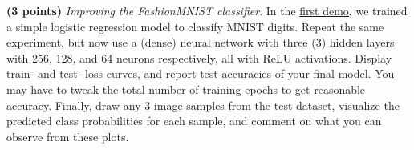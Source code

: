\noindent {} 
\textbf{(3 points)} \textit{Improving the FashionMNIST classifier}. In the \href{https://github.com/kvgarimella/dl-demos/blob/main/demo01-basics.ipynb}{\underline{first demo}}, we trained a simple logistic regression model to classify MNIST digits. Repeat the same experiment, but now use a (dense) neural network with three (3) hidden layers with 256, 128, and 64 neurons respectively, all with ReLU activations. Display train- and test- loss curves, and report test accuracies of your final model. You may have to tweak the total number of training epochs to get reasonable accuracy. Finally, draw any 3 image samples from the test dataset, visualize the predicted class probabilities for each sample, and comment on what you can observe from these plots.
